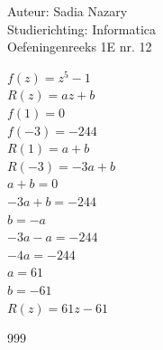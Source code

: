 \documentclass[a4paper]{article}
\begin{document}
  
\noindent \large Auteur: Sadia Nazary  \\
\noindent \large Studierichting: Informatica\\
\noindent \large Oefeningenreeks 1E nr. 12\\

\medskip

\normalsize

$f(z)=z^5-1$\\

$R(z)=az+b$\\

$f(1)=0$\\

$f(-3)=-244$\\

$R(1)=a+b$\\

$R(-3)=-3a+b$\\

$a+b=0$\\

$-3a+b=-244$\\

$b=-a$\\

$-3a-a=-244$\\

$-4a=-244$\\

$a=61$\\

$b=-61$\\

$R(z)=61z-61$\\

\begin{thebibliography}{999}
\end{thebibliography}
\end{document}
